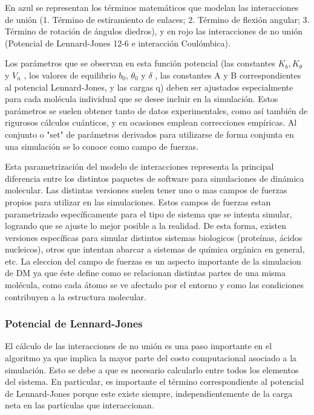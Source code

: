 En azul se representan los términos matemáticos que modelan las interacciones de unión (1. Término de estiramiento de enlaces; 2. Término de flexión angular; 3. Término de rotación de ángulos diedros), y en rojo
las interacciones de no unión (Potencial de Lennard-Jones 12-6 e interacción Coulómbica).

Los parámetros que se observan en esta función potencial (las constantes $K_b, K_{\theta}$ y $V_n$ , los valores de equilibrio $b_0$, $\theta_0$ y $\delta$ , 
las constantes A y B correspondientes al potencial Lennard-Jones, y las cargas q) deben ser ajustados especialmente para cada molécula individual que se desee incluir en la 
simulación. Estos parámetros se suelen obtener tanto de datos experimentales, como así también de rigurosos cálculos cuánticos, y en ocasiones emplean correcciones empíricas.
Al conjunto o "set" de parámetros derivados para utilizarse de forma conjunta en una simulación se lo conoce como campo de fuerzas.

Esta parametrización del modelo de interacciones representa la principal diferencia entre los distintos paquetes de software para simulaciones de dinámica molecular. 
Las distintas versiones suelen tener uno o mas campos de fuerzas propios para utilizar en las simulaciones. 
Estos campos de fuerzas estan parametrizado específicamente para el tipo de sistema que se intenta simular, logrando que se ajuste lo mejor posible a la realidad.
De esta forma, existen versiones específicas para simular distintos sistemas biologicos (proteínas, ácidos nucleicos), otros que intentan abarcar a sistemas de química orgánica en general, etc.
La eleccion del campo de fuerzas es un aspecto importante de la simulacion de DM ya que éste define como se relacionan distintas partes de una misma molécula, como cada átomo se ve afectado por el entorno y como las condiciones contribuyen a la estructura molecular. 




\subsubsection{Potencial de Lennard-Jones}

El cálculo de las interacciones de no unión es una paso importante en el algoritmo ya que implica la mayor parte del costo computacional asociado a la simulación. 
Esto se debe a que es necesario calcularlo entre todos los elementos del sistema. 
En particular, es importante el término correspondiente al potencial de Lennard-Jones porque este existe siempre, independientemente de la carga neta en las partículas que interaccionan.

